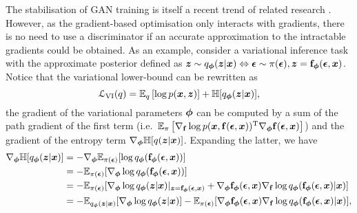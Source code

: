 The stabilisation of GAN training is itself a recent trend of related research \citep[e.g.~see][]{salimans:training2016, arjovsky:wgan2017}. However, as the gradient-based optimisation only interacts with gradients, there is no need to use a discriminator if an accurate approximation to the intractable gradients could be obtained. As an example, consider a variational inference task with the approximate posterior defined as $\bm{z} \sim q_{\bm{\phi}}(\bm{z} | \bm{x}) \Leftrightarrow \bm{\epsilon} \sim \pi(\bm{\epsilon}), \bm{z} = \mathbf{f}_{\bm{\phi}}(\bm{\epsilon}, \bm{x})$. Notice that the variational lower-bound can be rewritten as
\begin{equation}
\mathcal{L}_{\text{VI}}(q) = \mathbb{E}_{q} \left[ \log p(\bm{x}, \bm{z}) \right]  + \mathbb{H}[q_{\bm{\phi}}(\bm{z} | \bm{x})],
\label{eq:vi_objective_entropy}
\end{equation}
the gradient of the variational parameters $\bm{\phi}$ can be computed by a sum of the path gradient of the first term (i.e.~$\mathbb{E}_{\pi} \left[ \nabla_{\mathbf{f}} \log p(\bm{x}, \mathbf{f}(\bm{\epsilon}, \bm{x}))^{\text{T}} \nabla_{\bm{\phi}} \mathbf{f}(\bm{\epsilon}, \bm{x}) \right] $) and the gradient of the entropy term $\nabla_{\bm{\phi}} \mathbb{H}[q(\bm{z} | \bm{x})]$. Expanding the latter, we have 
\begin{equation}
\begin{aligned}
\nabla_{\bm{\phi}} \mathbb{H}[q_{\bm{\phi}}(\bm{z} | \bm{x})] 
&= - \nabla_{\bm{\phi}} \mathbb{E}_{\pi(\bm{\epsilon})}[\log q_{\bm{\phi}}(\mathbf{f}_{\bm{\phi}}(\bm{\epsilon}, \bm{x}))] \\
&= - \mathbb{E}_{\pi(\bm{\epsilon})}[ \nabla_{\bm{\phi}} \log q_{\bm{\phi}}(\mathbf{f}_{\bm{\phi}}(\bm{\epsilon}, \bm{x}))] \\
&= - \mathbb{E}_{\pi(\bm{\epsilon})}[ \nabla_{\bm{\phi}} \log q_{\bm{\phi}}(\bm{z} | \bm{x}) |_{\bm{z} = \mathbf{f}_{\bm{\phi}}(\bm{\epsilon}, \bm{x})} +  \nabla_{\bm{\phi}} \mathbf{f}_{\bm{\phi}}(\bm{\epsilon}, \bm{x})  \nabla_{\mathbf{f}} \log q_{\bm{\phi}}(\mathbf{f}_{\bm{\phi}}(\bm{\epsilon}, \bm{x}) | \bm{x}) ] \\
&= - \mathbb{E}_{q_{\bm{\phi}}(\bm{z} | \bm{x})} [ \nabla_{\bm{\phi}} \log q_{\bm{\phi}}(\bm{z} | \bm{x})] - \mathbb{E}_{\pi(\bm{\epsilon})} [ \nabla_{\bm{\phi}} \mathbf{f}_{\bm{\phi}}(\bm{\epsilon}, \bm{x}) \nabla_{\mathbf{f}} \log q_{\bm{\phi}}(\mathbf{f}_{\bm{\phi}}(\bm{\epsilon}, \bm{x}) | \bm{x})  ],
\end{aligned}
\label{eq:entropy_gradient}
\end{equation}
